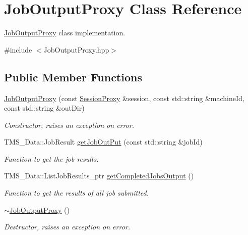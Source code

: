 \hypertarget{classJobOutputProxy}{
\section{JobOutputProxy Class Reference}
\label{classJobOutputProxy}
}


\hyperlink{classJobOutputProxy}{JobOutputProxy} class implementation.  




{\ttfamily \#include $<$JobOutputProxy.hpp$>$}

\subsection*{Public Member Functions}
\begin{DoxyCompactItemize}
\item 
\hyperlink{classJobOutputProxy_aee2c0babf8b2c1c82d9051f29acadb69}{JobOutputProxy} (const \hyperlink{classSessionProxy}{SessionProxy} \&session, const std::string \&machineId, const std::string \&outDir)
\begin{DoxyCompactList}\small\item\em Constructor, raises an exception on error. \item\end{DoxyCompactList}\item 
TMS\_\-Data::JobResult \hyperlink{classJobOutputProxy_a11bec7120c3cf89c233e9983aef0e5a3}{getJobOutPut} (const std::string \&jobId)
\begin{DoxyCompactList}\small\item\em Function to get the job results. \item\end{DoxyCompactList}\item 
TMS\_\-Data::ListJobResults\_\-ptr \hyperlink{classJobOutputProxy_a9ab79137e768f983f378553195f8b615}{getCompletedJobsOutput} ()
\begin{DoxyCompactList}\small\item\em Function to get the results of all job submitted. \item\end{DoxyCompactList}\item 
\hypertarget{classJobOutputProxy_ab183c53ebb3d04181abc86da377a5b6a}{
\hyperlink{classJobOutputProxy_ab183c53ebb3d04181abc86da377a5b6a}{$\sim$JobOutputProxy} ()}
\label{classJobOutputProxy_ab183c53ebb3d04181abc86da377a5b6a}

\begin{DoxyCompactList}\small\item\em Destructor, raises an exception on error. \item\end{DoxyCompactList}\end{DoxyCompactItemize}
